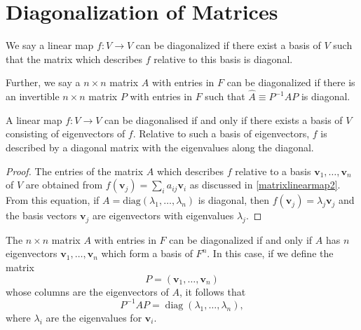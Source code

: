 \documentclass[a4paper,12pt]{report}
\begin{document}
\section{Diagonalization of Matrices}

\begin{definition}
We say a linear map \(f: V \rightarrow V\) can be diagonalized if there exist a basis of \(V\) such that the matrix which describes \(f\) relative to this basis is diagonal. 

Further, we say a \(n \times  n\) matrix \(A\) with entries in \(F\) can be diagonalized if there is an invertible \(n \times  n\) matrix \(P\) with entries in \(F\) such that \(\hat{A} \equiv P^{-1} AP \) is diagonal.   
\end{definition}

\begin{lemma}
A linear map \( f : V \to V \) can be diagonalised if and only if there exists a basis of \( V \) consisting of eigenvectors of \( f \). Relative to such a basis of eigenvectors, \( f \) is described by a diagonal matrix with the eigenvalues along the diagonal.
\end{lemma}

\begin{proof}
The entries of the matrix \( A \) which describes \( f \) relative to a basis \( \mathbf{v}_1, \ldots, \mathbf{v}_n \) of \( V \) are obtained from \(f(\mathbf{v}_j) = \sum_i a_{ij} \mathbf{v}_i\) as discussed in \cref{matrixlinearmap2}. From this equation, if \( A = \text{diag}(\lambda_1, \ldots, \lambda_n) \) is diagonal, then \( f(\mathbf{v}_j) = \lambda_j \mathbf{v}_j \) and the basis vectors \( \mathbf{v}_j \) are eigenvectors with eigenvalues \( \lambda_j \). 
\end{proof}

\begin{lemma} \label{diagonalizable} 
The \( n \times n \) matrix \( A \) with entries in \( F \) can be diagonalized if and only if \( A \) has \( n \) eigenvectors \( \mathbf{v}_1, \ldots, \mathbf{v}_n \) which form a basis of \( F^n \). In this case, if we define the matrix
\begin{equation}
    P = (\mathbf{v}_1, \ldots, \mathbf{v}_n)
\end{equation}
whose columns are the eigenvectors of \( A \), it follows that
\begin{equation}
    P^{-1} A P = \operatorname{diag}(\lambda_1, \ldots, \lambda_n),
\end{equation}
where \( \lambda_i \) are the eigenvalues for \( \mathbf{v}_i \).
\end{lemma}
\end{document}
